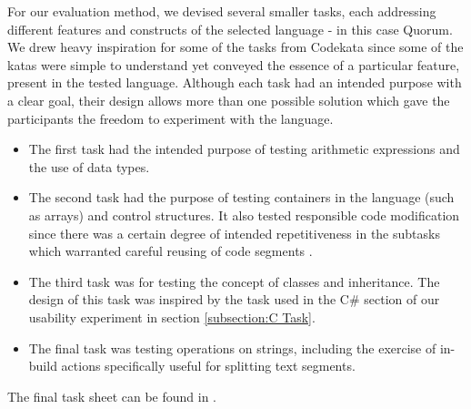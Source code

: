 For our evaluation method, we devised several smaller tasks, each addressing different features and constructs of the selected language - in this case Quorum. We drew heavy inspiration for some of the tasks from Codekata \cite{Codekata} since some of the katas were simple to understand yet conveyed the essence of a particular feature, present in the tested language.
Although each task had an intended purpose with a clear goal, their design allows more than one possible solution which gave the participants the freedom to experiment with the language.
\begin{itemize}
\item The first task had the intended purpose of testing arithmetic expressions and the use of data types.
\item The second task had the purpose of testing containers in the language (such as arrays) and control structures.
It also tested responsible code modification since there was a certain degree of intended repetitiveness in the subtasks which warranted careful reusing of code segments .%
\item The third task was for testing the concept of classes and inheritance. The design of this task was inspired by the task used in the C\# section of our usability experiment in section \ref{subsection:C Task}.
\item The final task was testing operations on strings, including the exercise of in-build actions specifically useful for splitting text segments.
\end{itemize}

The final task sheet can be found in .
